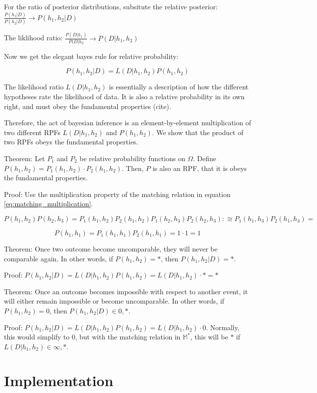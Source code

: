 \documentclass[twoside]{article}
\begin{document}
For the ratio of posterior distributions, subsitute the relative posterior: \(\frac{P(h_1|D)}{P(h_2|D)} \rightarrow P(h_1, h_2|D) \)

The liklihood ratio: \(\frac{P(D|h_1)}{P(D|h_2} \rightarrow P(D|h_1, h_2) \)

Now we get the elegant bayes rule for relative probability:

 \[P(h_1, h_2|D) = L(D|h_1, h_2) P(h_1, h_2)\]
 
 The likelihood ratio \(L(D|h_1, h_2)\) is essentially a description of how the different hypotheses rate the likelihood of data. It is also a relative probability in its own right, and must obey the fundamental properties (cite).
 
 Therefore, the act of bayesian inference is an element-by-element multiplication of two different RPFs \(L(D|h_1, h_2)\) and \(P(h_1, h_2)\). We show that the product of two RPFs obeys the fundamental properties.
 
 Theorem: Let \(P_1\) and \(P_2\) be relative probability functions on \(\Omega\). Define \(P(h_1, h_2) = P_1(h_1, h_2) \cdot P_2(h_1, h_2)\). Then, \(P\) is also an RPF, that it is obeys the fundamental properties.
 
 Proof: Use the multiplication property of the matching relation in equation \ref{eq:matching_multiplication}.
 
 \[P(h_1, h_2)P(h_2, h_3)=P_1(h_1, h_2) P_2(h_1, h_2)P_1(h_2, h_3) P_2(h_2, h_3) :\cong P_1(h_1, h_3) P_2(h_1, h_3)=\]

\[P(h_1, h_1) = P_1(h_1, h_1) P_2(h_1, h_1)=1 \cdot 1=1\]

Theorem: Once two outcome become uncomparable, they will never be comparable again. In other words, if \(P(h_1, h_2)=\ast\), then \(P(h_1, h_2|D) = \ast\).

Proof: \(P(h_1, h_2|D) = L(D|h_1, h_2) P(h_1, h_2) = L(D|h_1, h_2) \cdot \ast = \ast\)

Theorem: Once an outcome becomes impossible with respect to another event, it will either remain impossible or become uncomparable. In other words,  if \(P(h_1, h_2)=0\), then \(P(h_1, h_2|D) \in {0, \ast}\).

Proof: \(P(h_1, h_2|D) = L(D|h_1, h_2) P(h_1, h_2) = L(D|h_1, h_2) \cdot 0\). Normally, this would simplify to 0, but with the matching relation in \(\mathbb{M}^*\), this will be \(\ast\) if \(L(D|h_1, h_2) \in {\infty, \ast}\).

\section{Implementation}
\end{document}
